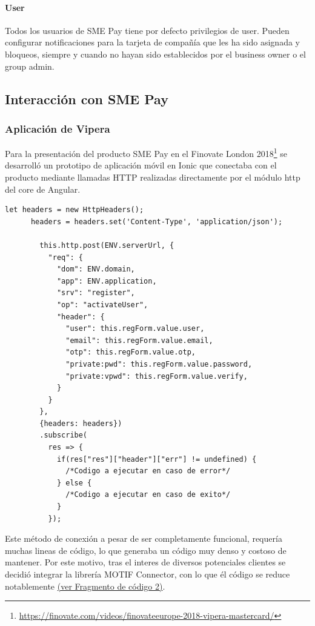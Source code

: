 \documentclass[a4paper, 12pt]{article}
\newenvironment{code}{\captionsetup{type=listing}}{}
\begin{document}
\paragraph{User}
\label{sec-3-1-5-3}
\label{sec:user}
Todos los usuarios de SME Pay tiene por defecto privilegios de user. Pueden configurar notificaciones para la tarjeta de compañía que les ha sido asignada y bloqueos, siempre y cuando no hayan sido
establecidos por el business owner o el group admin.

\subsection{Interacción con SME Pay}
\label{sec-3-2}
\subsubsection{Aplicación de Vipera}
\label{sec-3-2-1}
Para la presentación del producto SME Pay en el Finovate London 2018\footnote{\url{https://finovate.com/videos/finovateeurope-2018-vipera-mastercard/}} se desarrolló un prototipo de aplicación móvil en Ionic que conectaba con el producto mediante llamadas HTTP realizadas directamente por
el módulo http del core de Angular.
\begin{code}
\label{code:angularhttp}
\begin{verbatim}
let headers = new HttpHeaders();
      headers = headers.set('Content-Type', 'application/json');

        this.http.post(ENV.serverUrl, {
          "req": {
            "dom": ENV.domain,
            "app": ENV.application,
            "srv": "register",
            "op": "activateUser",
            "header": {
              "user": this.regForm.value.user,
              "email": this.regForm.value.email,
              "otp": this.regForm.value.otp,
              "private:pwd": this.regForm.value.password,
              "private:vpwd": this.regForm.value.verify,
            }
          }
        },
        {headers: headers})
        .subscribe(
          res => {
            if(res["res"]["header"]["err"] != undefined) {
              /*Codigo a ejecutar en caso de error*/
            } else {
              /*Codigo a ejecutar en caso de exito*/
            }
          });
\end{verbatim}
\end{code}
\bigbreak
Este método de conexión a pesar de ser completamente funcional, requería muchas lineas de código, lo que generaba un código muy denso y costoso de mantener. Por este motivo, tras el interes de
diversos potenciales clientes se decidió integrar la librería MOTIF Connector, con lo que él código se reduce notablemente \hyperref[code:motifconnector]{(ver Fragmento de código 2)}.
\end{document}
